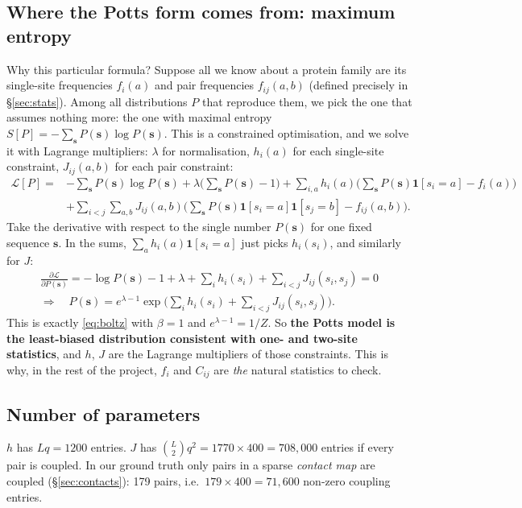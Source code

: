 \documentclass[11pt,a4paper]{article}
\newcommand{\s}{\bm{s}}
\newcommand{\one}{\mathbf{1}}
\begin{document}
\subsection{Where the Potts form comes from: maximum entropy}\label{sec:maxent}
Why this particular formula? Suppose all we know about a protein family are its single-site
frequencies $f_i(a)$ and pair frequencies $f_{ij}(a,b)$ (defined precisely in \S\ref{sec:stats}).
Among all distributions $P$ that reproduce them, we pick the one that assumes nothing more: the one
with maximal entropy $S[P]=-\sum_{\s}P(\s)\log P(\s)$. This is a constrained optimisation, and we
solve it with Lagrange multipliers: $\lambda$ for normalisation, $h_i(a)$ for each single-site
constraint, $J_{ij}(a,b)$ for each pair constraint:
\begin{align*}
\mathcal{L}[P] = &-\sum_{\s}P(\s)\log P(\s) + \lambda\Big(\sum_{\s}P(\s)-1\Big)
 + \sum_{i,a}h_i(a)\Big(\sum_{\s}P(\s)\one[s_i=a]-f_i(a)\Big)\\
 &+ \sum_{i<j}\sum_{a,b}J_{ij}(a,b)\Big(\sum_{\s}P(\s)\one[s_i=a]\one[s_j=b]-f_{ij}(a,b)\Big).
\end{align*}
Take the derivative with respect to the single number $P(\s)$ for one fixed sequence $\s$. In the
sums, $\sum_a h_i(a)\one[s_i=a]$ just picks $h_i(s_i)$, and similarly for $J$:
\begin{gather*}
\frac{\partial\mathcal{L}}{\partial P(\s)} = -\log P(\s) - 1 + \lambda + \sum_i h_i(s_i) + \sum_{i<j}J_{ij}(s_i,s_j) = 0\\
\Longrightarrow\quad
P(\s) = e^{\lambda-1}\exp\Big(\sum_i h_i(s_i)+\sum_{i<j}J_{ij}(s_i,s_j)\Big).
\end{gather*}
This is exactly \eqref{eq:boltz} with $\beta=1$ and $e^{\lambda-1}=1/Z$. So \textbf{the Potts model is
the least-biased distribution consistent with one- and two-site statistics}, and $h$, $J$ are the
Lagrange multipliers of those constraints. This is why, in the rest of the project, $f_i$ and
$C_{ij}$ are \emph{the} natural statistics to check.

\subsection{Number of parameters}
$h$ has $Lq=1200$ entries. $J$ has $\binom{L}{2}q^2 = 1770\times400 = 708{,}000$ entries if every
pair is coupled. In our ground truth only pairs in a sparse \emph{contact map} are coupled
(\S\ref{sec:contacts}): 179 pairs, i.e.\ $179\times 400=71{,}600$ non-zero coupling entries.
\end{document}
